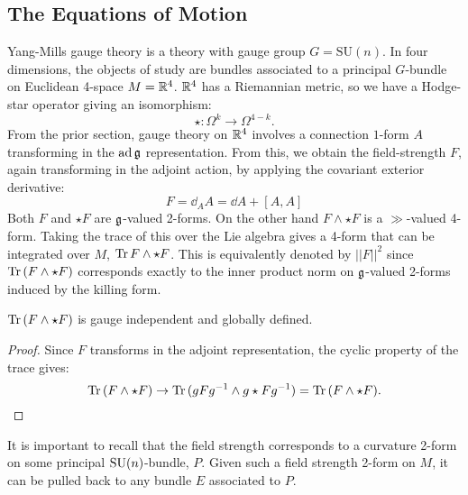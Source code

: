 \subsection{The Equations of Motion} %
\label{sub:the_equations_of_motion}

Yang-Mills gauge theory is a theory with gauge group $G = \mathrm{SU}(n)$. In four dimensions, the objects of study are bundles associated to a principal $G$-bundle on Euclidean 4-space $M = \mathbb{R}^4$. $\mathbb{R}^4$ has a Riemannian metric, so we have a Hodge-star operator giving an isomorphism:
\[
	\star: \Omega^k \to \Omega^{4-k}.
\]
From the prior section, gauge theory on $\mathbb{R}^4$ involves a connection $1$-form $A$ transforming in the $\mathrm{ad}\,\frak{g}$ representation. From this, we obtain the field-strength $F$, again transforming in the adjoint action, by applying the covariant exterior derivative:
\begin{equation}
	F = \dd_A A = \dd A + [A, A]
\end{equation}
Both $F$ and $\star F$ are $\frak g$-valued 2-forms. On the other hand $F \wedge \star F$ is a $\gg$-valued 4-form. Taking the trace of this over the Lie algebra gives a 4-form that can be integrated over $M$, $\mathrm{Tr}\, F \wedge \star F$. This is equivalently denoted by $||F||^2$ since $\mathrm{Tr}\, (F \wedge \star  F)$ corresponds exactly to the inner product norm on $\frak g$-valued 2-forms induced by the killing form.

\begin{prop}
	$\mathrm{Tr}\,(F \wedge \star F)$ is gauge independent and globally defined.
\end{prop}
\begin{proof}
	Since $F$ transforms in the adjoint representation, the cyclic property of the trace gives:
	\[
		\mathrm{Tr}\,(F \wedge \star F) \to \mathrm{Tr}\,(g F g^{-1} \wedge g \star F g^{-1}) = \mathrm{Tr}\,(F \wedge \star F).
	\]
\end{proof}
It is important to recall that the field strength corresponds to a curvature 2-form on some principal $\mathrm{SU}(n)$-bundle, $P$. Given such a field strength 2-form on $M$, it can be pulled back to any bundle $E$ associated to $P$. 

